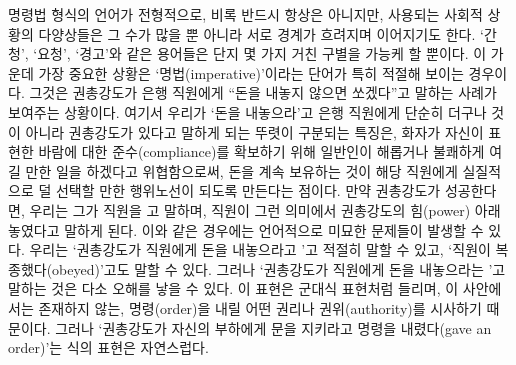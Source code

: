 명령법 형식의 언어가 전형적으로, 비록 반드시 항상은 아니지만, 사용되는
사회적 상황의 다양상들은 그 수가 많을 뿐 아니라 서로 경계가 흐려지며
이어지기도 한다. ‘간청’, ‘요청’, ‘경고’와 같은 용어들은 단지 몇 가지
거친 구별을 가능케 할 뿐이다. 이 가운데 가장 중요한 상황은
‘명법(imperative)’이라는 단어가 특히 적절해 보이는 경우이다. 그것은
권총강도가 은행 직원에게 “돈을 내놓지 않으면 쏘겠다”고 말하는 사례가
보여주는 상황이다. 여기서 우리가 ‘돈을 내놓으라’고 은행 직원에게 단순히
 더구나  것이
아니라 권총강도가  있다고 말하게 되는 뚜렷이
구분되는 특징은, 화자가 자신이 표현한 바람에 대한 준수(compliance)를
확보하기 위해 일반인이 해롭거나 불쾌하게 여길 만한 일을 하겠다고
위협함으로써, 돈을 계속 보유하는 것이 해당 직원에게 실질적으로 덜 선택할
만한 행위노선이 되도록 만든다는 점이다. 만약 권총강도가 성공한다면,
우리는 그가 직원을 고 말하며, 직원이 그런
의미에서 권총강도의 힘(power) 아래 놓였다고 말하게 된다. 이와 같은
경우에는 언어적으로 미묘한 문제들이 발생할 수 있다. 우리는 ‘권총강도가
직원에게 돈을 내놓으라고 ’고 적절히 말할 수
있고, ‘직원이 복종했다(obeyed)’고도 말할 수 있다. 그러나 ‘권총강도가
직원에게 돈을 내놓으라는 ’고 말하는
것은 다소 오해를 낳을 수 있다. 이 표현은 군대식 표현처럼 들리며, 이
사안에서는 존재하지 않는, 명령(order)을 내릴 어떤 권리나
권위(authority)를 시사하기 때문이다. 그러나 ‘권총강도가 자신의 부하에게
문을 지키라고 명령을 내렸다(gave an order)’는 식의 표현은 자연스럽다.

